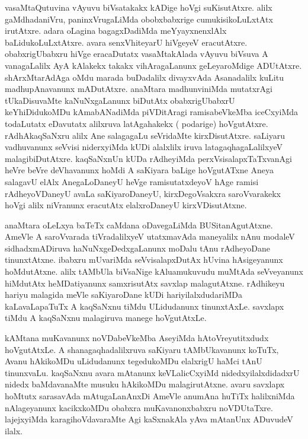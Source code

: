 \documentclass{article}
\begin{document}
\begin{mn}%
vasaMtaQutuvina vAyuvu biVsatakakx kADige hoVgi suKisutAtxre. alilx gaMdhadaniVru, 
paninxVrugaLiMda obobxbabxrige cumukisikoLuLxtAtx irutAtxre. adara oLagina bagagxDadiMda 
meYyayxnenxlAlx baLidukoLuLxtAtxre. avara senxVhiteyarU hiVgeyeV eracutAtxre. 
obabxrigUbabxru hiVge eracaDutatx vasaMtakAlada vAyuvu biVsuva A vanagaLalilx AyA kAlakekx
takakx vihAragaLanunx geLeyaroMdige ADUtAtxre. shArxMtarAdAga oMdu marada buDadalilx 
divayxvAda Asanadalilx kuLitu madhupAnavanunx mADutAtxre. anaMtara madhunviniMda 
mutatxrAgi tUkaDisuvaMte kaNuNxgaLanunx biDutAtx obabxrigUbabxrU keYhiDidukoMDu 
kAmabANadiMda piVDitAragi ramisabeVkeMba iceCxyiMda todaLutatx eDavutatx alilxruva 
latAgahakekx ( podarige) hoVgutAtxre. rAdhAkaqSaNxru alilx Ane salagagaLu seVridaMte 
kirxDisutAtxre. saLiyaru vadhuvanunx seVvisi niderxyiMda kUDi alalxlilx iruva 
latagaqhagaLalilxyeV malagibiDutAtxre. kaqSaNxnUn kUDa rAdheyiMda perxVsisalapxTaTxvanAgi 
heVre beVre deVhavanunx hoMdi A saKiyara baLige hoVgutATxne Aneya salagavU elAlx 
AnegaLoDaneyU heVge ramisutatxdeyoV hAge ramisi rAdheyoVDaneyU avaLa saKiyaroDaneyU, 
kirxDegoVsakxra saroVvarakekx hoVgi alilx niVranunx eracutAtx elalxroDaneyU 
kirxVDisutAtxne.
\end{mn}


\begin{mn}%
anaMtara oLeLxya baTeTx caMdana oDavegaLiMda BUSitanAgutAtxne. AmeVle A saroVvarada 
tiVradalilxyeV utatxmavAda maneyalilx nAnu modaleV sidhadxmADiruva haNuNxgeDedxgaLanunx 
moDalu tAnu rAdheyoDane tinunxtAtxne. ibabxru mUvariMda seVvisalapxDutAx hUvina 
hAsigeyanunx hoMdutAtxne. alilx tAMbUla biVsaNige kAluamukuvudu muMtAda seVveyanunx 
hiMdutAtx heMDatiyanunx samxrisutAtx savxlap malagutAtxne. rAdhikeyu hariyu malagida 
meVle saKiyaroDane kUDi hariyilalxdudariMDa kaLavaLapaTuTx A kaqSaNxnu tiMdu ULidudanunx 
tinunxtAxLe. savxlapx tiMdu A kaqSaNxnu malagiruva manege hoVgutAtxLe.
\end{mn}

\begin{mn}%
kAMtana muKavanunx noVDabeVkeMba AseyiMda hAtoVreyutitxdudx hoVgutAtxLe. A 
shanagaqhadalilxruva saKiyaru tAMbUkavanunx koTuTx, Avanu hAkikoMDu uLidudanunx 
tegedukoMDu elalxrigU haMci tAnU tinunxvaLu. kaqSaNxnu  avara mAtanunx keVLalicCxyiMd 
nidedxyilalxdidadxrU nidedx baMdavanaMte musuku hAkikoMDu malagirutAtxne. avaru savxlapx 
hoMtutx sarasavAda mAtugaLanAnxDi AmeVle  anumAna huTiTx halilxniMda nAlageyanunx 
kacikxkoMDu obabxra muKavanonxbabxru noVDUtaTxre. lajejxyiMda karagihoVdavaraMte Agi 
kaSxnakAla yAva mAtanUnx ADuvudeV ilalx.
\end{mn}
\end{document}
